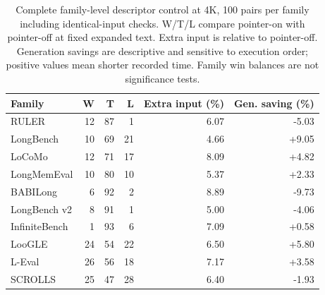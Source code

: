 \begin{table}[htbp]
\centering
\small
\setlength{\tabcolsep}{4pt}
\caption{Complete family-level descriptor control at 4K, 100 pairs per family including identical-input checks. W/T/L compare pointer-on with pointer-off at fixed expanded text. Extra input is relative to pointer-off. Generation savings are descriptive and sensitive to execution order; positive values mean shorter recorded time. Family win balances are not significance tests.}
\label{tab:descriptor-families}
\begin{tabular}{lrrrrr}
\toprule
Family & W & T & L & Extra input (\%) & Gen. saving (\%) \\
\midrule
RULER & 12 & 87 & 1 & 6.07 & -5.03 \\
LongBench & 10 & 69 & 21 & 4.66 & +9.05 \\
LoCoMo & 12 & 71 & 17 & 8.09 & +4.82 \\
LongMemEval & 10 & 80 & 10 & 5.37 & +2.33 \\
BABILong & 6 & 92 & 2 & 8.89 & -9.73 \\
LongBench v2 & 8 & 91 & 1 & 5.00 & -4.06 \\
InfiniteBench & 1 & 93 & 6 & 7.09 & +0.58 \\
LooGLE & 24 & 54 & 22 & 6.50 & +5.80 \\
L-Eval & 26 & 56 & 18 & 7.17 & +3.58 \\
SCROLLS & 25 & 47 & 28 & 6.40 & -1.93 \\
\bottomrule
\end{tabular}
\end{table}
